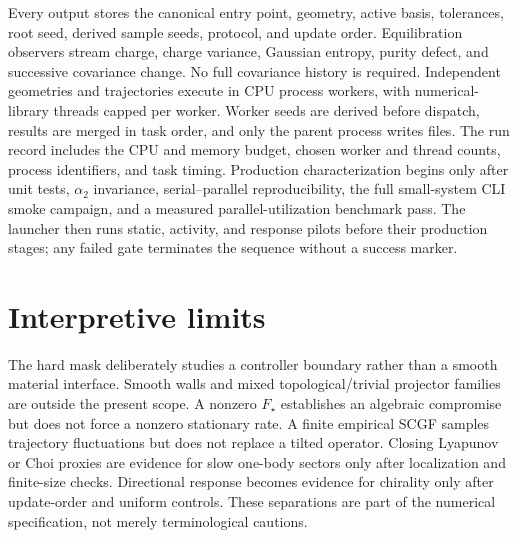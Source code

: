 \documentclass[aps,prb,onecolumn,nofootinbib,superscriptaddress]{revtex4-2}
\begin{document}
Every output stores the canonical entry point, geometry, active basis,
tolerances, root seed, derived sample seeds, protocol, and update order.
Equilibration observers stream charge, charge variance, Gaussian entropy,
purity defect, and successive covariance change.  No full covariance history
is required.  Independent geometries and trajectories execute in CPU process
workers, with numerical-library threads capped per worker.  Worker seeds are
derived before dispatch, results are merged in task order, and only the parent
process writes files.  The run record includes the CPU and memory budget,
chosen worker and thread counts, process identifiers, and task timing.
Production characterization begins only after unit tests, $\alpha_2$
invariance, serial--parallel reproducibility, the full small-system CLI smoke
campaign, and a measured parallel-utilization benchmark pass.  The launcher
then runs static, activity, and response pilots before their production stages;
any failed gate terminates the sequence without a success marker.

\section{Interpretive limits}

The hard mask deliberately studies a controller boundary rather than a smooth
material interface.  Smooth walls and mixed topological/trivial projector
families are outside the present scope.  A nonzero $F_\star$ establishes an
algebraic compromise but does not force a nonzero stationary rate.  A finite
empirical SCGF samples trajectory fluctuations but does not replace a tilted
operator.  Closing Lyapunov or Choi proxies are evidence for slow one-body
sectors only after localization and finite-size checks.  Directional response
becomes evidence for chirality only after update-order and uniform controls.
These separations are part of the numerical specification, not merely
terminological cautions.
\end{document}
